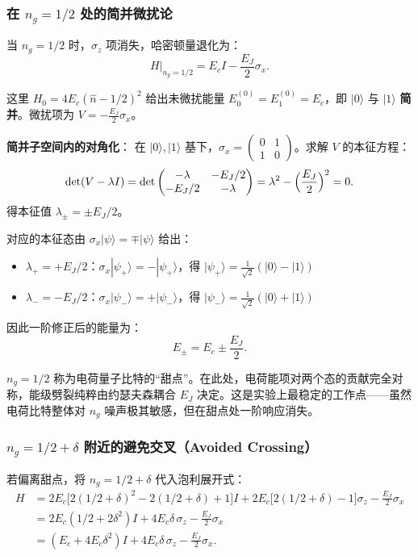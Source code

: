 \subsubsection{在 $n_g = 1/2$ 处的简并微扰论}

当 $n_g = 1/2$ 时，$\sigma_z$ 项消失，哈密顿量退化为：
\[
H\bigg|_{n_g=1/2} = E_c I - \frac{E_J}{2} \sigma_x.
\]

这里 $H_0 = 4E_c(\hat{n}-1/2)^2$ 给出未微扰能量 $E_0^{(0)} = E_1^{(0)} = E_c$，即 $|0\rangle$ 与 $|1\rangle$ \textbf{简并}。微扰项为 $V = -\frac{E_J}{2}\sigma_x$。

\textbf{简并子空间内的对角化}：
在 $|0\rangle, |1\rangle$ 基下，$\sigma_x = \begin{pmatrix} 0 & 1 \\ 1 & 0 \end{pmatrix}$。求解 $V$ 的本征方程：
\[
\det(V - \lambda I) = \det\begin{pmatrix} -\lambda & -E_J/2 \\ -E_J/2 & -\lambda \end{pmatrix} = \lambda^2 - \Bigl(\frac{E_J}{2}\Bigr)^2 = 0.
\]
得本征值 $\lambda_\pm = \pm E_J/2$。

对应的本征态由 $\sigma_x |\psi\rangle = \mp |\psi\rangle$ 给出：
\begin{itemize}[nosep]
    \item $\lambda_+ = +E_J/2$：$\sigma_x |\psi_+\rangle = -|\psi_+\rangle$，得 $|\psi_+\rangle = \frac{1}{\sqrt{2}}(|0\rangle - |1\rangle)$
    \item $\lambda_- = -E_J/2$：$\sigma_x |\psi_-\rangle = +|\psi_-\rangle$，得 $|\psi_-\rangle = \frac{1}{\sqrt{2}}(|0\rangle + |1\rangle)$
\end{itemize}

因此一阶修正后的能量为：
\[
\boxed{E_\pm = E_c \pm \frac{E_J}{2}}.
\]

\begin{tipbox}
$n_g=1/2$ 称为电荷量子比特的``甜点''。在此处，电荷能项对两个态的贡献完全对称，能级劈裂纯粹由约瑟夫森耦合 $E_J$ 决定。这是实验上最稳定的工作点——虽然电荷比特整体对 $n_g$ 噪声极其敏感，但在甜点处一阶响应消失。
\end{tipbox}

\subsubsection{$n_g = 1/2 + \delta$ 附近的避免交叉（Avoided Crossing）}

若偏离甜点，将 $n_g = 1/2 + \delta$ 代入泡利展开式：
\begin{align*}
H &= 2E_c\bigl[2(1/2+\delta)^2 - 2(1/2+\delta) + 1\bigr] I + 2E_c\bigl[2(1/2+\delta) - 1\bigr] \sigma_z - \frac{E_J}{2}\sigma_x \\
&= 2E_c(1/2 + 2\delta^2) I + 4E_c\delta \, \sigma_z - \frac{E_J}{2}\sigma_x \\
&= (E_c + 4E_c\delta^2)I + 4E_c\delta\,\sigma_z - \frac{E_J}{2}\sigma_x.
\end{align*}

